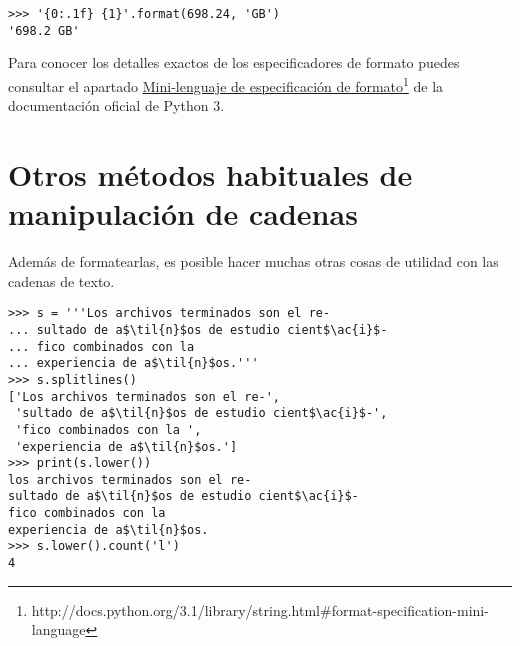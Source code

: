 \noindent\begin{minipage}{\textwidth}
\begin{lstlisting}[mathescape=True]
>>> '{0:.1f} {1}'.format(698.24, 'GB')
'698.2 GB'
\end{lstlisting}
\end{minipage}

Para conocer los detalles exactos de los especificadores de formato puedes consultar el apartado \href{http://docs.python.org/3.1/library/string.html#format-specification-mini-language}{Mini-lenguaje de especificación de formato\footnote{\href{http://docs.python.org/3.1/library/string.html\#format-specification-mini-language}{http://docs.python.org/3.1/library/string.html\#format-specification-mini-language}}} de la documentación oficial de Python 3.

\section{Otros métodos habituales de manipulación de cadenas}

Además de formatearlas, es posible hacer muchas otras cosas de utilidad con las cadenas de texto.

\noindent\begin{minipage}{\textwidth}
\begin{lstlisting}[mathescape=True]
>>> s = '''Los archivos terminados son el re-
... sultado de a$\til{n}$os de estudio cient$\ac{i}$-
... fico combinados con la 
... experiencia de a$\til{n}$os.'''
>>> s.splitlines()
['Los archivos terminados son el re-', 
 'sultado de a$\til{n}$os de estudio cient$\ac{i}$-', 
 'fico combinados con la ', 
 'experiencia de a$\til{n}$os.']
>>> print(s.lower())
los archivos terminados son el re-
sultado de a$\til{n}$os de estudio cient$\ac{i}$-
fico combinados con la 
experiencia de a$\til{n}$os.
>>> s.lower().count('l')
4
\end{lstlisting}
\end{minipage}

